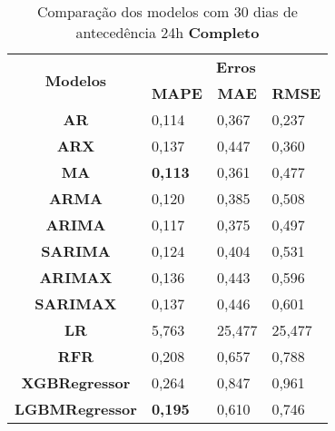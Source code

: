 \begin{table}[H]
	\centering
	\caption{Comparação dos modelos com 30 dias de antecedência 24h \textbf{Completo} }\label{tb:60-24cm}
	\begin{tabular}{@{}clll@{}}
		\toprule
		\multirow{2}{*}{\textbf{Modelos}} & \multicolumn{3}{c}{\textbf{Erros}}                                                                       \\ \cmidrule(l){2-4} 
		& \multicolumn{1}{c}{\textbf{MAPE}} & \multicolumn{1}{c}{\textbf{MAE}} & \multicolumn{1}{c}{\textbf{RMSE}} \\ \hline
\textbf{AR}                       & 0,114                             & 0,367                            & 0,237                             \\
\textbf{ARX}                      & 0,137                             & 0,447                            & 0,360                             \\
\textbf{MA}                       & \textbf{0,113}                             & 0,361                            & 0,477                             \\
\textbf{ARMA}                     & 0,120                             & 0,385                            & 0,508                             \\
\textbf{ARIMA}                    & 0,117                             & 0,375                            & 0,497                             \\
\textbf{SARIMA}                   & 0,124                             & 0,404                            & 0,531                             \\
\textbf{ARIMAX}                   & 0,136                             & 0,443                            & 0,596                             \\
\textbf{SARIMAX}                  & 0,137                             & 0,446                            & 0,601                             \\
\textbf{LR}                       & 5,763                             & 25,477                           & 25,477                            \\
\textbf{RFR}                      & 0,208                             & 0,657                            & 0,788                             \\
\textbf{XGBRegressor}             & 0,264                             & 0,847                            & 0,961                             \\
\textbf{LGBMRegressor}            & \textbf{0,195}                             & 0,610                            & 0,746                             \\ \bottomrule
	\end{tabular}

\end{table}